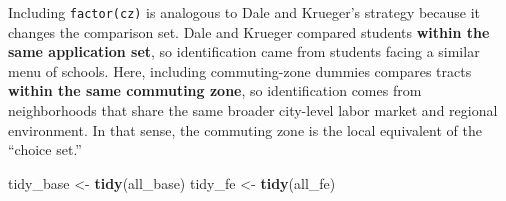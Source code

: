 \documentclass[
]{article}
\newenvironment{Shaded}{\begin{snugshade}}{\end{snugshade}}
\newcommand{\FunctionTok}[1]{\textcolor[rgb]{0.13,0.29,0.53}{\textbf{#1}}}
\newcommand{\NormalTok}[1]{#1}
\newcommand{\OtherTok}[1]{\textcolor[rgb]{0.56,0.35,0.01}{#1}}
\begin{document}
Including \texttt{factor(cz)} is analogous to Dale and Krueger's
strategy because it changes the comparison set. Dale and Krueger
compared students \textbf{within the same application set}, so
identification came from students facing a similar menu of schools.
Here, including commuting-zone dummies compares tracts \textbf{within
the same commuting zone}, so identification comes from neighborhoods
that share the same broader city-level labor market and regional
environment. In that sense, the commuting zone is the local equivalent
of the ``choice set.''

\begin{Shaded}
\begin{Highlighting}[]
\NormalTok{tidy\_base }\OtherTok{\textless{}{-}} \FunctionTok{tidy}\NormalTok{(all\_base)}
\NormalTok{tidy\_fe }\OtherTok{\textless{}{-}} \FunctionTok{tidy}\NormalTok{(all\_fe)}


\end{Highlighting}
\end{Shaded}
\end{document}
